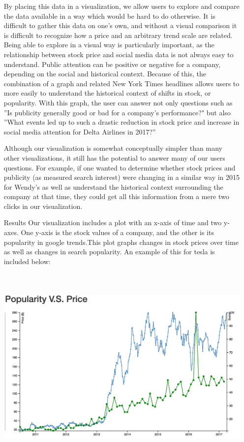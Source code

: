 \documentclass[12pt]{article}
\begin{document}
\begin{enumerate}
By placing this data in a visualization, we allow users to explore and
compare the data available in a way which would be hard to do
otherwise. It is difficult to gather this data on one’s own, and
without a visual comparison it is difficult to recognize how a price
and an arbitrary trend scale are related. Being able to explore in a
visual way is particularly important, as the relationship between
stock price and social media data is not always easy to
understand. Public attention can be positive or negative for a
company, depending on the social and historical context. Because of
this, the combination of a graph and related New York Times headlines
allows users to more easily to understand the historical  context of
shifts in stock, or popularity. With this graph, the user can answer
not only  questions such as ''Is publicity generally good or bad for a
company's performance?" but also ''What events led up to such a
drastic reduction in stock price and increase in social media
attention for Delta Airlines in 2017?'' 

Although our visualization is somewhat conceptually simpler than many
other visualizations, it still has the potential to answer many of our
users questions. For example, if one wanted to determine whether stock
prices and publicity (as measured search interest) were changing in a
similar way in 2015 for Wendy’s as well as understand the historical
context surrounding the company at that time, they could get all this
information from a mere two clicks in our visualization. 

 
\item[Results]
Our visualization includes a plot with an x-axis of time and two
y-axes. One y-axis is the stock values of a company, and the other is
its popularity in google trends.This plot graphs changes in stock
prices over time as well as changes in search popularity. An example
of this for tesla is included below: 

\includegraphics[height=10cm]{tesla-graph.png} 


\end{enumerate}
\end{document}
